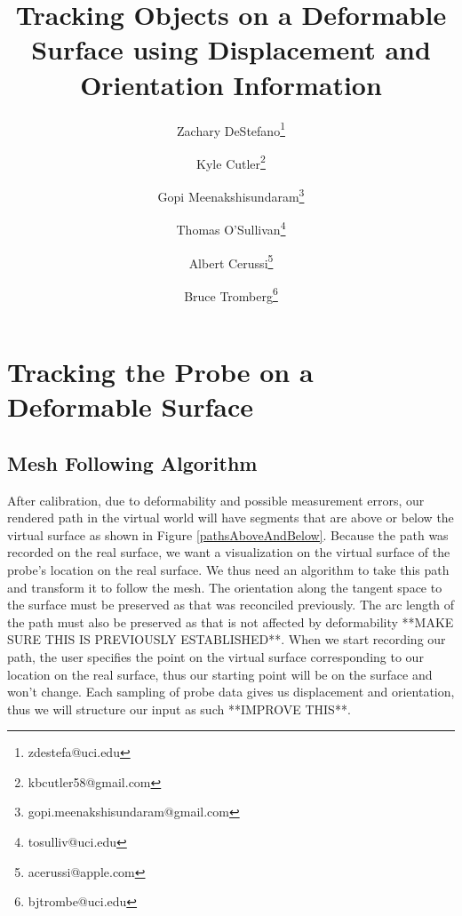 \documentclass[conference]{acmsiggraph}
\title{Tracking Objects on a Deformable Surface using Displacement and Orientation Information}
\author[1]{Zachary DeStefano\thanks{zdestefa@uci.edu}}
\author[1]{Kyle Cutler\thanks{kbcutler58@gmail.com}}
\author[1]{Gopi Meenakshisundaram\thanks{gopi.meenakshisundaram@gmail.com}}
\author[1]{Thomas O'Sullivan\thanks{tosulliv@uci.edu}}
\author[1]{Albert Cerussi\thanks{acerussi@apple.com}}
\author[1]{Bruce Tromberg\thanks{bjtrombe@uci.edu}}
\affil[1]{University of California, Irvine}
\begin{document}

\maketitle



\section{Tracking the Probe on a Deformable Surface}

\subsection{Mesh Following Algorithm}

After calibration, due to deformability and possible measurement errors, our rendered path in the virtual world will have segments that are above or below the virtual surface as shown in Figure \ref{pathsAboveAndBelow}. Because the path was recorded on the real surface, we want a visualization on the virtual surface of the probe's location on the real surface. We thus need an algorithm to take this path and transform it to follow the mesh. The orientation along the tangent space to the surface must be preserved as that was reconciled previously. The arc length of the path must also be preserved as that is not affected by deformability **MAKE SURE THIS IS PREVIOUSLY ESTABLISHED**. When we start recording our path, the user specifies the point on the virtual surface corresponding to our location on the real surface, thus our starting point will be on the surface and won't change. Each sampling of probe data gives us displacement and orientation, thus we will structure our input as such **IMPROVE THIS**. 
\end{document}
